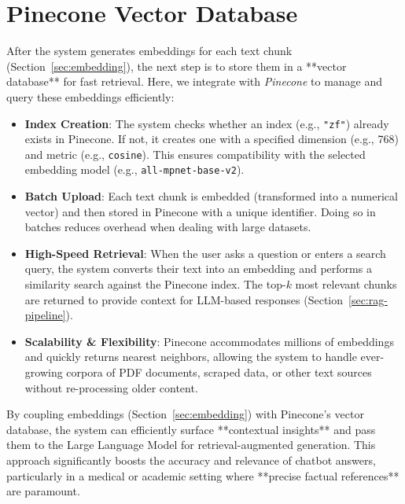 \section{Pinecone Vector Database}
\label{sec:pinecone}

After the system generates embeddings for each text chunk (Section~\ref{sec:embedding}), the next step is to store them in a **vector database** for fast retrieval. Here, we integrate with \emph{Pinecone} to manage and query these embeddings efficiently:

\begin{itemize}
    \item \textbf{Index Creation}: The system checks whether an index (e.g., \texttt{"zf"}) already exists in Pinecone. If not, it creates one with a specified dimension (e.g., 768) and metric (e.g., \texttt{cosine}). This ensures compatibility with the selected embedding model (e.g., \texttt{all-mpnet-base-v2}).
    \item \textbf{Batch Upload}: Each text chunk is embedded (transformed into a numerical vector) and then stored in Pinecone with a unique identifier. Doing so in batches reduces overhead when dealing with large datasets.
    \item \textbf{High-Speed Retrieval}: When the user asks a question or enters a search query, the system converts their text into an embedding and performs a similarity search against the Pinecone index. The top-$k$ most relevant chunks are returned to provide context for LLM-based responses (Section~\ref{sec:rag-pipeline}).
    \item \textbf{Scalability \& Flexibility}: Pinecone accommodates millions of embeddings and quickly returns nearest neighbors, allowing the system to handle ever-growing corpora of PDF documents, scraped data, or other text sources without re-processing older content.
\end{itemize}

By coupling embeddings (Section~\ref{sec:embedding}) with Pinecone’s vector database, the system can efficiently surface **contextual insights** and pass them to the Large Language Model for retrieval-augmented generation. This approach significantly boosts the accuracy and relevance of chatbot answers, particularly in a medical or academic setting where **precise factual references** are paramount.


